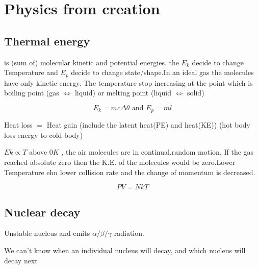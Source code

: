 \documentclass[a4paper]{article}
\begin{document}
\section{Physics from creation}
\subsection{Thermal energy}

\begin{defi}
is (sum of) molecular kinetic and potential energies.
the $E_k$ decide to change Temperature and $E_p$ decide to change state/shape.In an ideal gas the molecules have only kinetic energy. The temperature stop increasing at the point which is boiling point (gas $\iff$ liquid) or melting point (liquid $\iff$ solid)
\end{defi}

\begin{defi}
\begin{equation*}
    E_k=mc\Delta\theta \mbox{~and~} E_p=ml
\end{equation*}
\end{defi}

\begin{defi}
Heat loss $=$ Heat gain (include the latent heat(PE) and heat(KE))
(hot body loss energy to cold body)
\end{defi}

\begin{defi}[Gases]
$Ek\propto T$ above $0K$ , the air molecules are in continual.random motion, If the gas reached absolute zero then the K.E. of the molecules would be zero.Lower Temperature ehn lower collision rate and the change of momentum is decreased.
\end{defi}

\begin{defi}
\begin{equation*}
    PV=NkT
\end{equation*}
\end{defi}



\subsection{Nuclear decay}
\begin{defi}
Unstable nucleus and emits $\alpha/\beta/\gamma$ radiation.
\end{defi}
\begin{defi}
We can't know when an individual nucleus will decay, and which nucleus will decay next
\end{defi}
\end{document}
